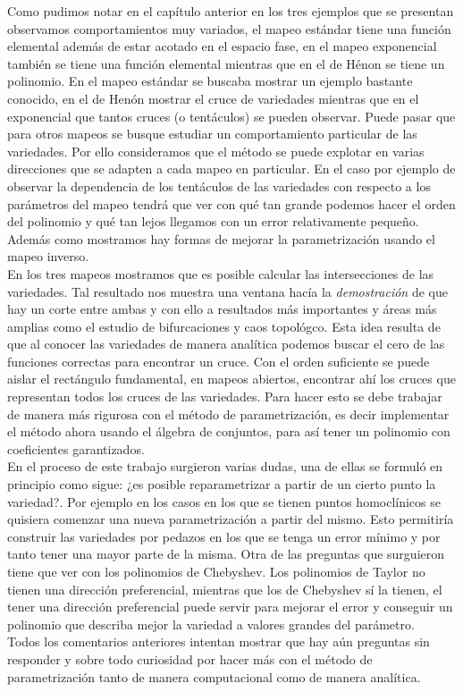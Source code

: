 Como pudimos notar en el capítulo anterior en los tres ejemplos que se presentan observamos comportamientos muy variados, el mapeo estándar tiene una función elemental además de estar acotado en el espacio fase, en el mapeo exponencial también se tiene una función elemental mientras que en el de Hénon se tiene un polinomio. En el mapeo estándar se buscaba mostrar un ejemplo bastante conocido, en el de Henón mostrar el cruce de variedades mientras que en el exponencial que tantos cruces (o tentáculos) se pueden observar. Puede pasar que para otros mapeos se busque estudiar un comportamiento particular de las variedades. Por ello consideramos que el método se puede explotar en varias direcciones que se adapten a cada mapeo en particular. En el caso por ejemplo de observar la dependencia de los tentáculos de las variedades con respecto a los parámetros del mapeo tendrá que ver con qué tan grande podemos hacer el orden del polinomio y qué tan lejos llegamos con un error relativamente pequeño. Además como mostramos hay formas de mejorar la parametrización usando el mapeo inverso. \\

En los tres mapeos mostramos que es posible calcular las intersecciones de las variedades. Tal resultado nos muestra una ventana hacía la \emph{demostración} de que hay un corte entre ambas y con ello a resultados más importantes y áreas más amplias como el estudio de bifurcaciones y caos topológco. Esta idea resulta de que al conocer las variedades de manera analítica podemos buscar el cero de las funciones correctas para encontrar un cruce. Con el orden suficiente se puede aislar el rectángulo fundamental, en mapeos abiertos, encontrar ahí los cruces que representan todos los cruces de las variedades. Para hacer esto se debe trabajar de manera más rigurosa con el método de parametrización, es decir implementar el método ahora usando el álgebra de conjuntos, para así tener un polinomio con coeficientes garantizados.   \\

En el proceso de este trabajo surgieron varias dudas, una de ellas se formuló en principio como sigue: ¿es posible reparametrizar a partir de un cierto punto la variedad?. Por ejemplo en los casos en los que se tienen puntos homoclínicos se quisiera comenzar una nueva parametrización a partir del mismo. Esto permitiría construir las variedades por pedazos en los que se tenga un error mínimo y por tanto tener una mayor parte de la misma. Otra de las preguntas que surguieron tiene que ver con los polinomios de Chebyshev. Los polinomios de Taylor no tienen una dirección preferencial, mientras que los de Chebyshev sí la tienen, el tener una dirección preferencial puede servir para mejorar el error y conseguir un polinomio que describa mejor la variedad a valores grandes del parámetro.\\


Todos los comentarios anteriores intentan mostrar que hay aún preguntas sin responder y sobre todo curiosidad por hacer más con el método de parametrización tanto de manera computacional como de manera analítica. 

